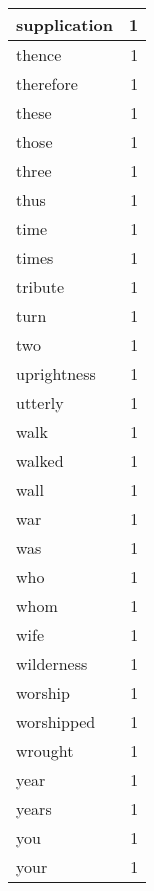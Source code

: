 \begin{center}
\begin{longtable}{l|r}
supplication & 1 \\ \hline
thence & 1 \\ \hline
therefore & 1 \\ \hline
these & 1 \\ \hline
those & 1 \\ \hline
three & 1 \\ \hline
thus & 1 \\ \hline
time & 1 \\ \hline
times & 1 \\ \hline
tribute & 1 \\ \hline
turn & 1 \\ \hline
two & 1 \\ \hline
uprightness & 1 \\ \hline
utterly & 1 \\ \hline
walk & 1 \\ \hline
walked & 1 \\ \hline
wall & 1 \\ \hline
war & 1 \\ \hline
was & 1 \\ \hline
who & 1 \\ \hline
whom & 1 \\ \hline
wife & 1 \\ \hline
wilderness & 1 \\ \hline
worship & 1 \\ \hline
worshipped & 1 \\ \hline
wrought & 1 \\ \hline
year & 1 \\ \hline
years & 1 \\ \hline
you & 1 \\ \hline
your & 1 \\ \hline
\end{longtable}
\end{center}



\normalsize



 
